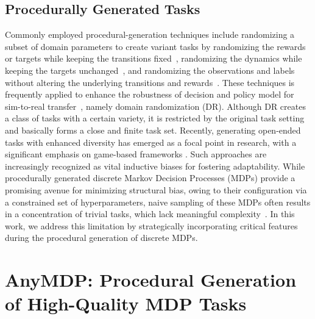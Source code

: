 \documentclass{article}
\begin{document}
\subsection{Procedurally Generated Tasks}
Commonly employed procedural-generation techniques include randomizing a subset of domain parameters to create variant tasks by randomizing the rewards or targets while keeping the transitions fixed~\citep{laskin2022context, lee2024supervised, mishra2018simple, finn2017model, yu2020meta, alegre2022mo}, randomizing the dynamics while keeping the targets unchanged~\citep{najarro2020meta,wang2022evolving,cobbe2020leveraging, pedersen2021evolving, akyurek2024context, nikulin2023xland}, and randomizing the observations and labels without altering the underlying transitions and rewards~\citep{kirsch2022general,morad2023popgym,sinii2024context}.
These techniques is frequently applied to enhance the robustness of decision and policy model for sim-to-real transfer~\citep{peng2018sim, team2022learning, akkaya2019solving}, namely domain randomization (DR).
Although DR creates a class of tasks with a certain variety, it is restricted by the original task setting and basically forms a close and finite task set.
Recently, generating open-ended tasks with enhanced diversity has emerged as a focal point in research, with a significant emphasis on game-based frameworks \citep{team2021open, team2022learning, wang2024benchmarking, nikulin2024xland, team2021open, team2022learning, bauer2023human}. Such approaches are increasingly recognized as vital inductive biases for fostering adaptability. While procedurally generated discrete Markov Decision Processes (MDPs) provide a promising avenue for minimizing structural bias, owing to their configuration via a constrained set of hyperparameters, naive sampling of these MDPs often results in a concentration of trivial tasks, which lack meaningful complexity~\citep{archibald1995generation, bhatnagar2009natural}. In this work, we address this limitation by strategically incorporating critical features during the procedural generation of discrete MDPs.
\section{AnyMDP: Procedural Generation of High-Quality MDP Tasks}\label{sec:anymdp}
\end{document}
